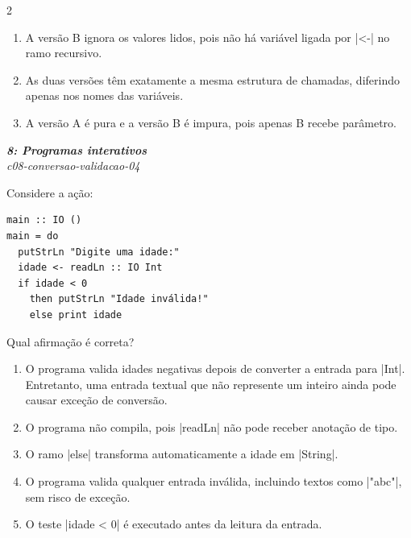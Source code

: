 \documentclass[a4paper,10pt,brazil]{article}
\begin{document}
\begin{multicols}{2}
\begin{enumerate}
  \item A versão B ignora os valores lidos, pois não há variável ligada por \haskellinline|<-| no ramo recursivo.

  \item As duas versões têm exatamente a mesma estrutura de chamadas, diferindo apenas nos nomes das variáveis.

  \item A versão A é pura e a versão B é impura, pois apenas B recebe parâmetro.


\end{enumerate}

\begin{flushright}
  \footnotesize
  \textit{\textbf{8: Programas interativos}}\\
  \textit{c08-conversao-validacao-04}\\

\end{flushright}
Considere a ação:

\begin{verbatim}
main :: IO ()
main = do
  putStrLn "Digite uma idade:"
  idade <- readLn :: IO Int
  if idade < 0
    then putStrLn "Idade inválida!"
    else print idade
\end{verbatim}

Qual afirmação é correta?

\begin{enumerate}
  \item O programa valida idades negativas depois de converter a entrada para \haskellinline|Int|. Entretanto, uma entrada textual que não represente um inteiro ainda pode causar exceção de conversão.

  \item O programa não compila, pois \haskellinline|readLn| não pode receber anotação de tipo.

  \item O ramo \haskellinline|else| transforma automaticamente a idade em \haskellinline|String|.

  \item O programa valida qualquer entrada inválida, incluindo textos como \haskellinline|"abc"|, sem risco de exceção.

  \item O teste \haskellinline|idade < 0| é executado antes da leitura da entrada.


\end{enumerate}


\end{multicols}
\end{document}
